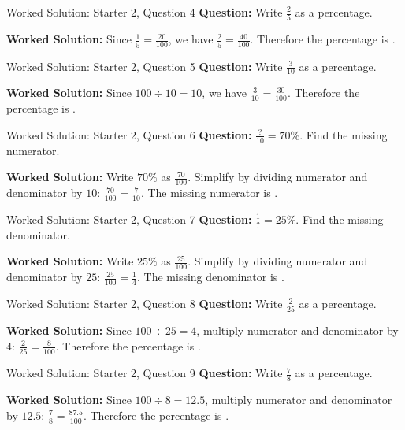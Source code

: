 \documentclass{beamer}
\newcommand{\ablank}[1]{%
  \alt<2>{\textcolor{red}{#1}}{\underline{\phantom{#1}}}%
}
\begin{document}
\begin{frame}[t]{Worked Solution: Starter 2, Question 4}
\textbf{Question:} Write \(\frac{2}{5}\) as a percentage.

\smallskip
\textbf{Worked Solution:} Since \(\frac{1}{5} = \frac{20}{100}\), we have \(\frac{2}{5} = \frac{40}{100}\). Therefore the percentage is \ablank{$40\%$}.
\end{frame}

\begin{frame}[t]{Worked Solution: Starter 2, Question 5}
\textbf{Question:} Write \(\frac{3}{10}\) as a percentage.

\smallskip
\textbf{Worked Solution:} Since \(100 \div 10 = 10\), we have \(\frac{3}{10} = \frac{30}{100}\). Therefore the percentage is \ablank{$30\%$}.
\end{frame}

\begin{frame}[t]{Worked Solution: Starter 2, Question 6}
\textbf{Question:} \(\frac{?}{10} = 70\%\). Find the missing numerator.

\smallskip
\textbf{Worked Solution:} Write \(70\%\) as \(\frac{70}{100}\). Simplify by dividing numerator and denominator by \(10\): \(\frac{70}{100} = \frac{7}{10}\). The missing numerator is \ablank{$7$}.
\end{frame}

\begin{frame}[t]{Worked Solution: Starter 2, Question 7}
\textbf{Question:} \(\frac{1}{?} = 25\%\). Find the missing denominator.

\smallskip
\textbf{Worked Solution:} Write \(25\%\) as \(\frac{25}{100}\). Simplify by dividing numerator and denominator by \(25\): \(\frac{25}{100} = \frac{1}{4}\). The missing denominator is \ablank{$4$}.
\end{frame}

\begin{frame}[t]{Worked Solution: Starter 2, Question 8}
\textbf{Question:} Write \(\frac{2}{25}\) as a percentage.

\smallskip
\textbf{Worked Solution:} Since \(100 \div 25 = 4\), multiply numerator and denominator by \(4\): \(\frac{2}{25} = \frac{8}{100}\). Therefore the percentage is \ablank{$8\%$}.
\end{frame}

\begin{frame}[t]{Worked Solution: Starter 2, Question 9}
\textbf{Question:} Write \(\frac{7}{8}\) as a percentage.

\smallskip
\textbf{Worked Solution:} Since \(100 \div 8 = 12.5\), multiply numerator and denominator by \(12.5\): \(\frac{7}{8} = \frac{87.5}{100}\). Therefore the percentage is \ablank{$87.5\%$}.
\end{frame}
\end{document}
